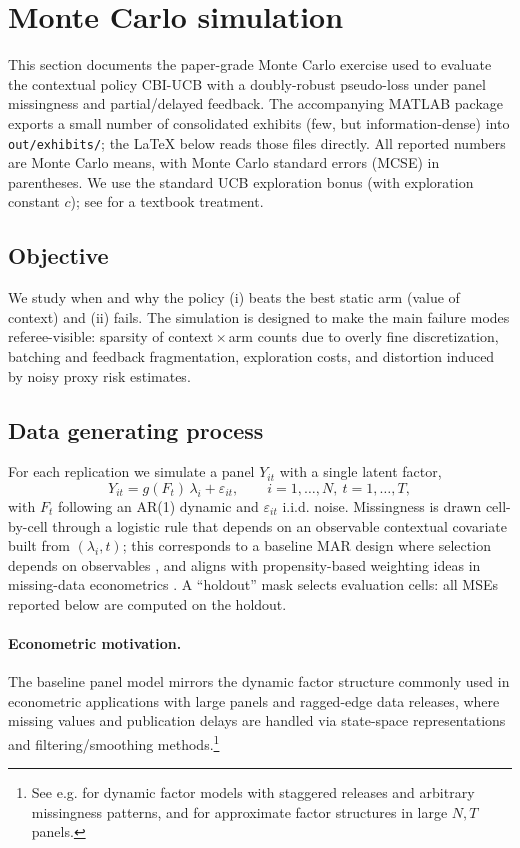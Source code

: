 \section{Monte Carlo simulation}

This section documents the paper-grade Monte Carlo exercise used to evaluate the contextual policy \textsc{CBI-UCB} with a doubly-robust pseudo-loss under panel missingness and partial/delayed feedback. The accompanying MATLAB package exports a small number of consolidated exhibits (few, but information-dense) into \texttt{out/exhibits/}; the LaTeX below reads those files directly. All reported numbers are Monte Carlo means, with Monte Carlo standard errors (MCSE) in parentheses.
We use the standard UCB exploration bonus (with exploration constant $c$); see \cite{LattimoreSzepesvari2020} for a textbook treatment.

\subsection{Objective}
We study when and why the policy (i) beats the best static arm (value of context) and (ii) fails. The simulation is designed to make the main failure modes referee-visible: sparsity of context\,$\times$\,arm counts due to overly fine discretization, batching and feedback fragmentation, exploration costs, and distortion induced by noisy proxy risk estimates.

\subsection{Data generating process}
For each replication we simulate a panel $Y_{it}$ with a single latent factor,
\begin{equation}
Y_{it} = g(F_t)\,\lambda_i + \varepsilon_{it}, \qquad i=1,\dots,N,\ t=1,\dots,T,
\end{equation}
with $F_t$ following an AR(1) dynamic and $\varepsilon_{it}$ i.i.d. noise. Missingness is drawn cell-by-cell through a logistic rule that depends on an observable contextual covariate built from $(\lambda_i,t)$; this corresponds to a baseline MAR design where selection depends on observables \cite{Rubin1976}, and aligns with propensity-based weighting ideas in missing-data econometrics \cite{Wooldridge2007}. A ``holdout'' mask selects evaluation cells: all MSEs reported below are computed on the holdout.

\paragraph{Econometric motivation.}
The baseline panel model mirrors the dynamic factor structure commonly used in econometric applications with large panels and ragged-edge data releases, where missing values and publication delays are handled via state-space representations and filtering/smoothing methods.\footnote{See e.g. \cite{GiannoneReichlinSmall2008,BanburaModugno2014} for dynamic factor models with staggered releases and arbitrary missingness patterns, and \cite{BaiNg2002} for approximate factor structures in large $N,T$ panels.}

